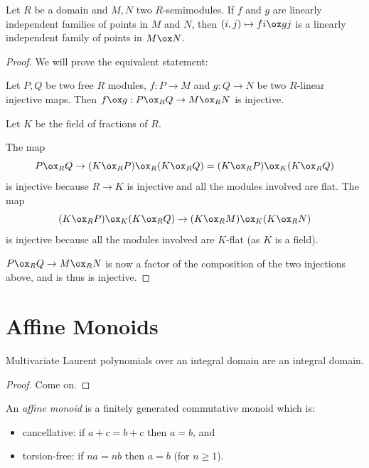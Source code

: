 \begin{lemma}
  \label{0-tensor-lin-indep}
  \leanok
  \mathlibok

  Let $R$ be a domain and $M, N$ two $R$-semimodules.
  If $f$ and $g$ are linearly independent families of points in $M$ and $N$, then $(i, j) \mapsto f i \ox g j$ is a linearly independent family of points in $M \ox N$.
\end{lemma}
\begin{proof}
  \leanok
  We will prove the equivalent statement:

  Let $P, Q$ be two free $R$ modules, $f : P \to M$ and $g : Q \to N$ be two $R$-linear injective maps.
  Then $f \ox g : P \ox_R Q \to M \ox_R N$ is injective.

  Let $K$ be the field of fractions of $R$.

  The map
  \[ P \ox_R Q \to (K \ox_R P) \ox_R (K \ox_R Q) = (K \ox_R P) \ox_K (K \ox_R Q) \]
  is injective because $R \to K$ is injective and all the modules involved are flat.
  The map
  \[ (K \ox_R P) \ox_K (K \ox_R Q) \to (K \ox_R M) \ox_K (K \ox_R N) \]
  is injective because all the modules involved are $K$-flat (as $K$ is a field).

  $P \ox_R Q \to M \ox_R N$ is now a factor of the composition of the two injections above, and is thus is injective.
\end{proof}


\section{Affine Monoids}


\begin{lemma}
  \label{0-mv-laurent-poly-domain}
  \leanok

  Multivariate Laurent polynomials over an integral domain are an integral domain.
\end{lemma}
\begin{proof}
  \leanok

  Come on.
\end{proof}


\begin{definition}
  \label{0-aff-mon}
  \leanok

  An \emph{affine monoid} is a finitely generated commutative monoid which is:
  \begin{itemize}
    \item cancellative: if $a + c = b + c$ then $a = b$, and
    \item torsion-free: if $n a = n b$ then $a = b$ (for $n \geq 1$).
  \end{itemize}
\end{definition}



